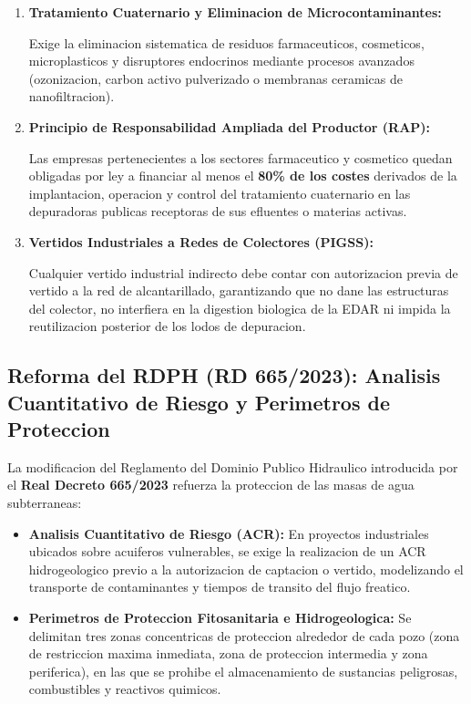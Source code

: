 \documentclass{report}
\begin{document}
\begin{enumerate}

    \item \textbf{Tratamiento Cuaternario y Eliminacion de Microcontaminantes:}

    Exige la eliminacion sistematica de residuos farmaceuticos, cosmeticos, microplasticos y disruptores endocrinos mediante procesos avanzados (ozonizacion, carbon activo pulverizado o membranas ceramicas de nanofiltracion).

    \item \textbf{Principio de Responsabilidad Ampliada del Productor (RAP):}

    Las empresas pertenecientes a los sectores farmaceutico y cosmetico quedan obligadas por ley a financiar al menos el \textbf{80\% de los costes} derivados de la implantacion, operacion y control del tratamiento cuaternario en las depuradoras publicas receptoras de sus efluentes o materias activas.

    \item \textbf{Vertidos Industriales a Redes de Colectores (PIGSS):}

    Cualquier vertido industrial indirecto debe contar con autorizacion previa de vertido a la red de alcantarillado, garantizando que no dane las estructuras del colector, no interfiera en la digestion biologica de la EDAR ni impida la reutilizacion posterior de los lodos de depuracion.

\end{enumerate}



\subsection{Reforma del RDPH (RD 665/2023): Analisis Cuantitativo de Riesgo y Perimetros de Proteccion}

La modificacion del Reglamento del Dominio Publico Hidraulico introducida por el \textbf{Real Decreto 665/2023} \cite{RD665_2023} refuerza la proteccion de las masas de agua subterraneas:

\begin{itemize}

    \item \textbf{Analisis Cuantitativo de Riesgo (ACR):} En proyectos industriales ubicados sobre acuiferos vulnerables, se exige la realizacion de un ACR hidrogeologico previo a la autorizacion de captacion o vertido, modelizando el transporte de contaminantes y tiempos de transito del flujo freatico.

    \item \textbf{Perimetros de Proteccion Fitosanitaria e Hidrogeologica:} Se delimitan tres zonas concentricas de proteccion alrededor de cada pozo (zona de restriccion maxima inmediata, zona de proteccion intermedia y zona periferica), en las que se prohibe el almacenamiento de sustancias peligrosas, combustibles y reactivos quimicos.

\end{itemize}
\end{document}
